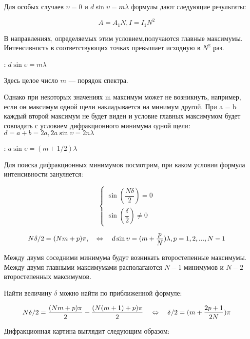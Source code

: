 Для особых случаев $\upsilon=0$ и $d\sin{\upsilon}=m\lambda$ формулы дают следующие результаты:

\begin{equation*}
	A=A_1 N, I = I_1 N^2
\end{equation*}

В направлениях, определяемых этим условием,получаются главные максимумы. Интенсивность в соответствующих точках превышает исходную в $N^2$ раз. 

: $d\sin{\upsilon}=m\lambda$

Здесь целое число $m$ --- порядок спектра.

Однако при некоторых значениях m максимум может не возникнуть, например, если он максимум одной щели накладывается на минимум другой. При a = b каждый второй максимум не будет виден и условие главных максимумом будет совпадать с условием дифракционного минимума одной щели: $d = a+b = 2a, 2a \sin{\upsilon} = 2n \lambda$

: $a \sin{\upsilon} = (m + 1/2) \lambda$ 

Для поиска дифракционных минимумов посмотрим, при каком условии формула интенсивности зануляется:

\begin{equation*}
 \begin{cases}
   \sin\left(\dfrac{N \delta}{2}\right) = 0 \\
	\sin\left(\dfrac{\delta}{2}\right) \ne 0
 \end{cases}
\end{equation*}

\begin{equation*}
	N\delta/2=(Nm+p)\pi, \quad \Leftrightarrow \quad d\sin{\upsilon}=(m+\frac{p}{N})\lambda, p = 1, 2, ..., N-1
\end{equation*}

Между двумя соседними минимума будут возникать второстепенные максимумы. Между двумя главными максимумами располагаются $N-1$ минимумов и $N-2$ второстепенных максимумов.

Найти величину $\delta$ можно найти по приближенной формуле:

\begin{equation*}
	N\delta/2=\frac{(Nm+p)\pi}{2}+\frac{(N(m+1)+p)\pi}{2} \quad \Leftrightarrow \quad \delta/2=(m+\frac{2p+1}{2N})\pi
\end{equation*}

Дифракционная картина выглядит следующим образом:

